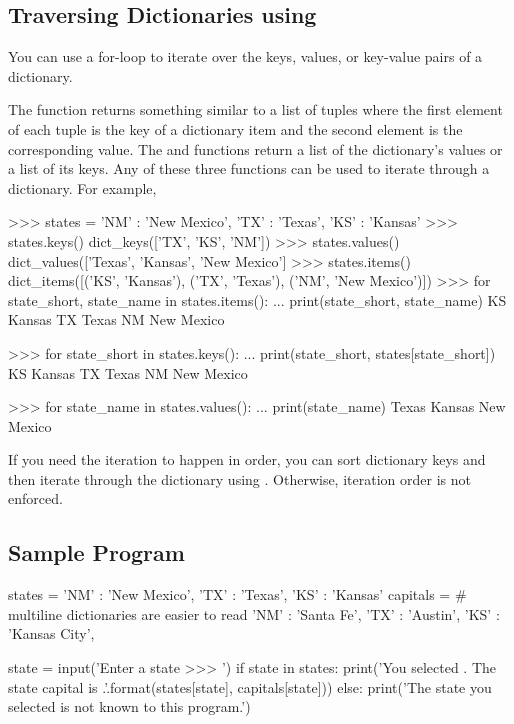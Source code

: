 \documentclass[11pt]{cselabheader}
\begin{document}
\subsection{Traversing Dictionaries using }
You can use a for-loop to iterate over the keys, values, or key-value pairs of a dictionary.

The  function returns something similar to a list of tuples where
the first element of each tuple is the key of a dictionary item and the
second element is the corresponding value. The 
and  functions return a list of the dictionary's
values or a list of its keys.
Any of these three functions can be used to iterate through a dictionary.
For example,

\begin{pyconcode}
>>> states = {'NM' : 'New Mexico', 'TX' : 'Texas', 'KS' : 'Kansas'}
>>> states.keys()
dict_keys(['TX', 'KS', 'NM'])
>>> states.values()
dict_values(['Texas', 'Kansas', 'New Mexico']
>>> states.items()
dict_items([('KS', 'Kansas'), ('TX', 'Texas'), ('NM', 'New Mexico')])
>>> for state_short, state_name in states.items():
...     print(state_short, state_name)
KS Kansas
TX Texas
NM New Mexico

>>> for state_short in states.keys():
...     print(state_short, states[state_short])
KS Kansas
TX Texas
NM New Mexico

>>> for state_name in states.values():
...     print(state_name)
Texas
Kansas
New Mexico

\end{pyconcode}

If you need the iteration to happen in order, you can sort dictionary
keys and then iterate through the dictionary 
using .
Otherwise, iteration order is not enforced.

\subsection{Sample Program}

\begin{python3code}
states = {'NM' : 'New Mexico', 'TX' : 'Texas', 'KS' : 'Kansas'}
capitals = { # multiline dictionaries are easier to read
  'NM' : 'Santa Fe',
  'TX' : 'Austin',
  'KS' : 'Kansas City',
}

state = input('Enter a state >>> ')
if state in states:
    print('You selected {}. The state capital is {}.'.format(states[state],
        capitals[state]))
else:
    print('The state you selected is not known to this program.')
\end{python3code}
\end{document}
